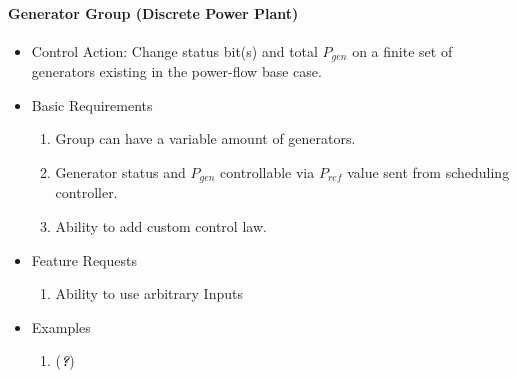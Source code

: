 \documentclass[12pt]{article}
\newcommand{\q}{(\textit{\textbf{?}})}
\begin{document}
\begin{multicols*}{2}
\paragraph{Generator Group (Discrete Power Plant)}
\begin{itemize}
	\item Control Action: Change status bit(s) and total $P_{gen}$ on a finite set of generators existing in the power-flow base case. 
	\item Basic Requirements
	\begin{enumerate}
		\item Group can have a variable amount of generators.
		\item Generator status and $P_{gen}$ controllable via $P_{ref}$ value sent from scheduling controller.
		\item Ability to add custom control law.
	\end{enumerate}
	\item Feature Requests
	\begin{enumerate}
		\item Ability to use arbitrary Inputs
	\end{enumerate}
	\item Examples
	\begin{enumerate}
	\item \q
	\end{enumerate}	
\end{itemize}
\vfill\null
\end{multicols*}
\pagebreak
\end{document}
